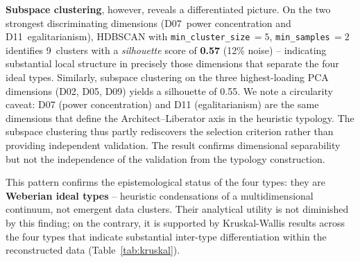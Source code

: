 \documentclass[12pt,a4paper]{article}
\begin{document}
\textbf{Subspace clustering}, however, reveals a differentiated picture. On the two strongest discriminating dimensions (D07~power concentration and D11~egalitarianism), HDBSCAN with \texttt{min\_cluster\_size}$\,=5$, \texttt{min\_samples}$\,=2$ identifies 9~clusters with a \emph{silhouette} score of \textbf{0.57} (12\% noise) -- indicating substantial local structure in precisely those dimensions that separate the four ideal types. Similarly, subspace clustering on the three highest-loading PCA dimensions (D02, D05, D09) yields a silhouette of 0.55. We note a circularity caveat: D07 (power concentration) and D11 (egalitarianism) are the same dimensions that define the Architect--Liberator axis in the heuristic typology. The subspace clustering thus partly rediscovers the selection criterion rather than providing independent validation. The result confirms dimensional separability but not the independence of the validation from the typology construction.

This pattern confirms the epistemological status of the four types: they are \textbf{Weberian ideal types} -- heuristic condensations of a multidimensional continuum, not emergent data clusters. Their analytical utility is not diminished by this finding; on the contrary, it is supported by Kruskal-Wallis results across the four types that indicate substantial inter-type differentiation within the reconstructed data (Table~\ref{tab:kruskal}).
\end{document}
